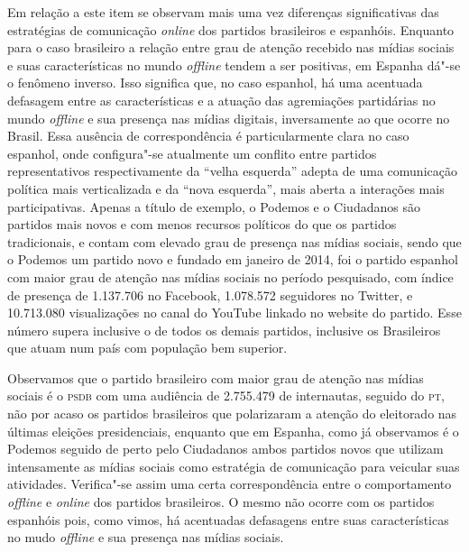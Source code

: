 Em relação a este item se observam mais uma vez diferenças
significativas das estratégias de comunicação \emph{online} dos partidos
brasileiros e espanhóis. Enquanto para o caso brasileiro a relação entre
grau de atenção recebido nas mídias sociais e suas características no
mundo \emph{offline} tendem a ser positivas, em Espanha dá"-se o fenômeno
inverso. Isso significa que, no caso espanhol, há uma acentuada
defasagem entre as características e a atuação das agremiações
partidárias no mundo \emph{offline} e sua presença nas mídias digitais,
inversamente ao que ocorre no Brasil. Essa ausência de correspondência é
particularmente clara no caso espanhol, onde configura"-se atualmente um
conflito entre partidos representativos respectivamente da ``velha
esquerda'' adepta de uma comunicação política mais verticalizada e da
``nova esquerda'', mais aberta a interações mais participativas. Apenas
a título de exemplo, o Podemos e o Ciudadanos são partidos mais novos e
com menos recursos políticos do que os partidos tradicionais, e contam
com elevado grau de presença nas mídias sociais, sendo que o Podemos um
partido novo e fundado em janeiro de 2014, foi o partido espanhol com
maior grau de atenção nas mídias sociais no período pesquisado, com
índice de presença de 1.137.706 no Facebook, 1.078.572 seguidores no
Twitter, e 10.713.080 visualizações no canal do YouTube linkado no
website do partido. Esse número supera inclusive o de todos os demais
partidos, inclusive os Brasileiros que atuam num país com população bem
superior.

Observamos que o partido brasileiro com maior grau
de atenção nas mídias sociais é o \textsc{psdb} com uma audiência de 2.755.479 de
internautas, seguido do \textsc{pt}, não por acaso os partidos brasileiros que
polarizaram a atenção do eleitorado nas últimas eleições presidenciais,
enquanto que em Espanha, como já observamos é o Podemos seguido de perto
pelo Ciudadanos ambos partidos novos que utilizam intensamente as mídias
sociais como estratégia de comunicação para veicular suas atividades.
Verifica"-se assim uma certa correspondência entre o comportamento
\emph{offline} e \emph{online} dos partidos brasileiros. O mesmo não ocorre com os
partidos espanhóis pois, como vimos, há acentuadas defasagens entre suas
características no mudo \emph{offline} e sua presença nas mídias sociais.

